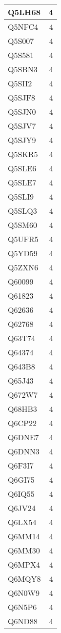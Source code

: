 \documentclass[
]{book}
\theoremstyle{definition}
\theoremstyle{definition}
\theoremstyle{definition}
\theoremstyle{definition}
\theoremstyle{remark}
\begin{document}
\begin{table}
\begin{tabular}{l|r}
\hline
Q5LH68 & 4\\
\hline
Q5NFC4 & 4\\
\hline
Q5S007 & 4\\
\hline
Q5S581 & 4\\
\hline
Q5SBN3 & 4\\
\hline
Q5SII2 & 4\\
\hline
Q5SJF8 & 4\\
\hline
Q5SJN0 & 4\\
\hline
Q5SJV7 & 4\\
\hline
Q5SJY9 & 4\\
\hline
Q5SKR5 & 4\\
\hline
Q5SLE6 & 4\\
\hline
Q5SLE7 & 4\\
\hline
Q5SLI9 & 4\\
\hline
Q5SLQ3 & 4\\
\hline
Q5SM60 & 4\\
\hline
Q5UFR5 & 4\\
\hline
Q5YD59 & 4\\
\hline
Q5ZXN6 & 4\\
\hline
Q60099 & 4\\
\hline
Q61823 & 4\\
\hline
Q62636 & 4\\
\hline
Q62768 & 4\\
\hline
Q63T74 & 4\\
\hline
Q64374 & 4\\
\hline
Q643B8 & 4\\
\hline
Q65J43 & 4\\
\hline
Q672W7 & 4\\
\hline
Q68HB3 & 4\\
\hline
Q6CP22 & 4\\
\hline
Q6DNE7 & 4\\
\hline
Q6DNN3 & 4\\
\hline
Q6F3I7 & 4\\
\hline
Q6GI75 & 4\\
\hline
Q6IQ55 & 4\\
\hline
Q6JV24 & 4\\
\hline
Q6LX54 & 4\\
\hline
Q6MM14 & 4\\
\hline
Q6MM30 & 4\\
\hline
Q6MPX4 & 4\\
\hline
Q6MQY8 & 4\\
\hline
Q6N0W9 & 4\\
\hline
Q6N5P6 & 4\\
\hline
Q6ND88 & 4\\

\end{tabular}
\end{table}
\end{document}
